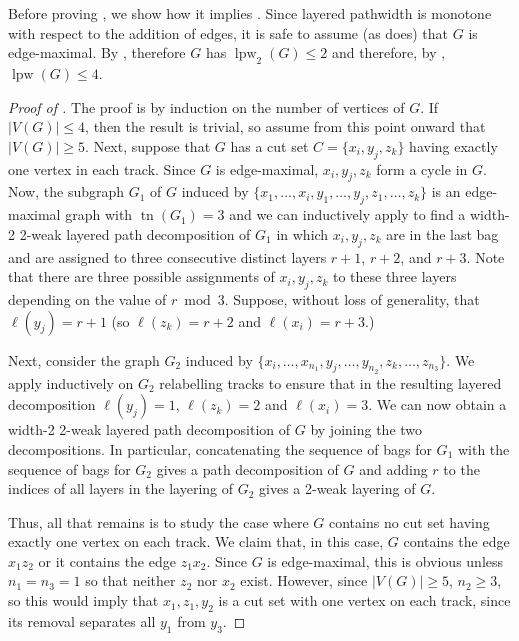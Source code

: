\documentclass{patmorin}
\DeclareMathOperator{\tr}{tn}
\DeclareMathOperator{\lpw}{lpw}
\begin{document}
Before proving , we show how it implies .
Since layered pathwidth is monotone with respect to the addition of edges, 
it is safe to assume (as  does) that $G$ is edge-maximal.
By , therefore $G$ has $\lpw_2(G)\le2$ and therefore, by
, $\lpw(G)\le 4$.

\begin{proof}[Proof of ]
  The proof is by induction on the number of vertices of $G$.  If
  $|V(G)|\le 4$, then the result is trivial, so assume from this point onward that $|V(G)|\ge 5$.  Next, suppose that $G$ has
  a cut set $C=\{x_i,y_j,z_k\}$ having exactly one vertex in each track.
  Since $G$ is edge-maximal, $x_i,y_j,z_k$ form a cycle in $G$.  Now,
  the subgraph $G_1$ of $G$ induced by $\{x_1,\ldots,x_i, y_1,\ldots,y_j,
  z_1,\ldots,z_k\}$ is an edge-maximal graph with $\tr(G_1)=3$ and we
  can inductively apply  to find a width-2 2-weak layered
  path decomposition of $G_1$ in which $x_i,y_j,z_k$ are in the last bag
  and are assigned to three consecutive distinct layers $r+1$, $r+2$, and $r+3$.
  Note that there are three possible assignments of $x_i,y_j,z_k$ to
  these three layers depending on the value of $r\bmod 3$.  Suppose,
  without loss of generality, that $\ell(y_j)=r+1$ (so $\ell(z_k)=r+2$
  and $\ell(x_i)=r+3$.)

  Next, consider the graph $G_2$ induced by
  $\{x_i,\ldots,x_{n_1},y_j,\ldots,y_{n_2},z_k,\ldots,z_{n_3}\}$.
  We apply  inductively on $G_2$ relabelling tracks to
  ensure that in the resulting layered decomposition $\ell(y_j)=1$,
  $\ell(z_k)=2$ and $\ell(x_i)=3$.   We can now obtain a width-2 2-weak
  layered path decomposition of $G$ by joining the two decompositions.
  In particular, concatenating the sequence of bags for $G_1$ with
  the sequence of bags for $G_2$ gives a path decomposition of $G$
  and adding $r$ to the indices of all layers in the layering of $G_2$
  gives a 2-weak layering of $G$.

  Thus, all that remains is to study the case where $G$ contains no cut
  set having exactly one vertex on each track.  We claim that, in this
  case, $G$ contains the edge $x_1z_2$ or it contains the edge $z_1x_2$.
  Since $G$ is edge-maximal, this is obvious unless $n_1=n_3=1$ so
  that neither $z_2$ nor $x_2$ exist.  However, since $|V(G)|\ge 5$, $n_2\ge 3$, so  this would imply that $x_1,z_1,y_2$ is a cut set with one vertex on
  each track, since its removal separates all $y_1$ from $y_3$.


\end{proof}
\end{document}
